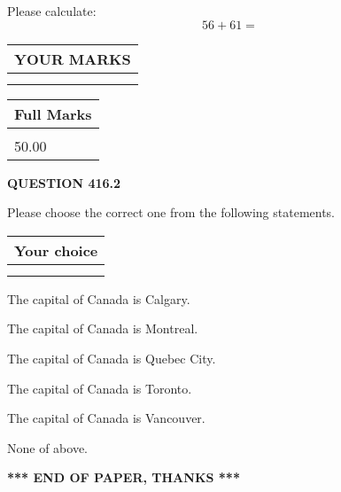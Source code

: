 \documentclass[12pt]{article}
\begin{document}
  
 
Please calculate:
\begin{equation}
56 +  %
61 = \nonumber
\end{equation}
 

 

 
  
\vspace{0.2in}
  
\noindent\begin{tabular}{|l|}
\hline
 YOUR MARKS  \\
\hline
 \\ 
 \\ 
\hline
\end{tabular}
\hspace{0.05in} \begin{tabular}{|l|}
\hline
 Full Marks  \\
\hline
 \\ 
50.00 \\
\hline
\end{tabular}
{\textbf{\Large{QUESTION
416.2 
}}}
  
  
Please choose the correct one from the following statements.
  
  
\noindent\hspace{3.0in} \begin{tabular}{|l|}
\hline
Your choice \\
\hline
 \\ 
 \\ 
\hline
\end{tabular}
  
  
 
 
The capital of Canada is Calgary.
 
 
The capital of Canada is Montreal.
 
 
The capital of Canada is Quebec City.
 
 
The capital of Canada is Toronto.
 
 
The capital of Canada is Vancouver.
 
 
 None of above.
 
 
   
   
 \vspace{0.2in}
 
   
   
   
   
\vspace{1.0in} 
{\textbf{\large{ *** END OF PAPER, THANKS *** }}} 
   
\end{document}

